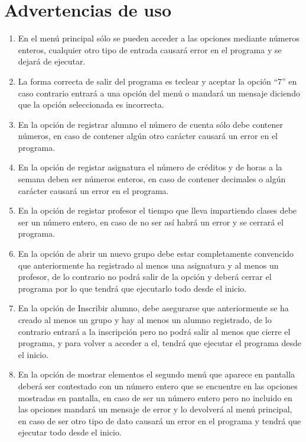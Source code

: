 \documentclass[12pt]{report}
\begin{document}
\newpage
\section*{Advertencias de uso}
\begin{enumerate}
    \item En el menú principal sólo se pueden acceder a las opciones mediante números enteros, cualquier otro tipo de entrada causará error en el programa y se dejará de ejecutar.
    \item La forma correcta de salir del programa es teclear y aceptar la opción ``7'' en caso contrario entrará a una opción del menú o mandará un mensaje diciendo que la opción seleccionada es incorrecta.
    \item En la opción de registrar alumno el número de cuenta sólo debe contener números, en caso de contener algún otro carácter causará un error en el programa.
    \item En la opción de registar asignatura el número de créditos y de horas a la semana deben ser números enteros, en caso de contener decimales o algún carácter causará un error en el programa.
    \item En la opción de registar profesor el tiempo que lleva impartiendo clases debe ser un número entero, en caso de no ser así habrá un error y se cerrará el programa.
    \item En la opción de abrir un nuevo grupo debe estar completamente convencido que anteriormente ha registrado al menos una asignatura y al menos un profesor, de lo contrario no podrá salir de la opción y deberá cerrar el programa por lo que tendrá que ejecutarlo todo desde el inicio.
    \item En la opción de Inscribir alumno, debe asegurarse que anteriormente se ha creado al menos un grupo y hay al menos un alumno registrado, de lo contrario entrará a la inscripción pero no podrá salir al menos que cierre el programa, y para volver a acceder a el, tendrá que ejecutar el programa desde el inicio.
    \item En la opción de mostrar elementos el segundo menú que aparece en pantalla deberá ser contestado con un número entero que se encuentre en las opciones mostradas en pantalla, en caso de ser un número entero pero no incluido en las opciones mandará un mensaje de error y lo devolverá al menú principal, en caso de ser otro tipo de dato causará un error en el programa y tendrá que ejecutar todo desde el inicio.
\end{enumerate}

\end{document}
